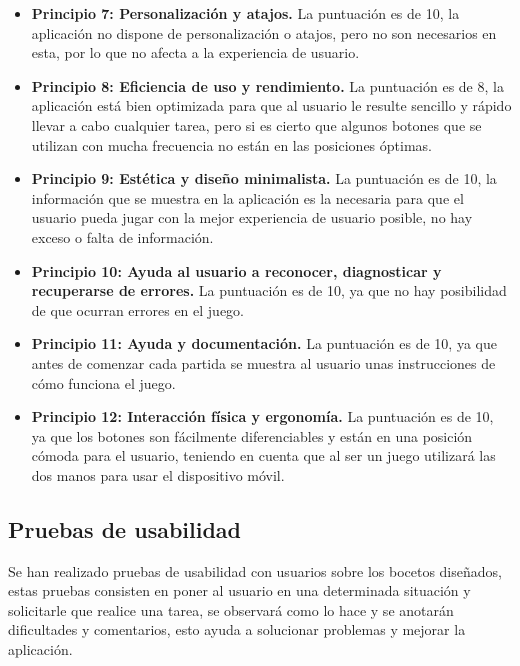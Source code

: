 \begin{itemize}
  \item \textbf{Principio 7: Personalización y atajos.}
  La puntuación es de 10, la aplicación no dispone de personalización o atajos, pero no son necesarios en esta, por lo que no afecta a la experiencia de usuario.

  \item \textbf{Principio 8: Eficiencia de uso y rendimiento.}
  La puntuación es de 8, la aplicación está bien optimizada para que al usuario le resulte sencillo y rápido llevar a cabo cualquier tarea, pero si es cierto que algunos botones que se utilizan con mucha frecuencia no están en las posiciones óptimas.

  \item \textbf{Principio 9: Estética y diseño minimalista.}
  La puntuación es de 10, la información que se muestra en la aplicación es la necesaria para que el usuario pueda jugar con la mejor experiencia de usuario posible, no hay exceso o falta de información.

  \item \textbf{Principio 10: Ayuda al usuario a reconocer, diagnosticar y recuperarse de errores.}
  La puntuación es de 10, ya que no hay posibilidad de que ocurran errores en el juego.

  \item \textbf{Principio 11: Ayuda y documentación.}
  La puntuación es de 10, ya que antes de comenzar cada partida se muestra al usuario unas instrucciones de cómo funciona el juego.

  \item \textbf{Principio 12: Interacción física y ergonomía.}
  La puntuación es de 10, ya que los botones son fácilmente diferenciables y están en una posición cómoda para el usuario, teniendo en cuenta que al ser un juego utilizará las dos manos para usar el dispositivo móvil.

\end{itemize}

\subsection{Pruebas de usabilidad}
Se han realizado pruebas de usabilidad con usuarios sobre los bocetos diseñados, estas pruebas consisten en poner al usuario en una determinada situación y solicitarle que realice una tarea, se observará como lo hace y se anotarán dificultades y comentarios, esto ayuda a solucionar problemas y mejorar la aplicación.\\

